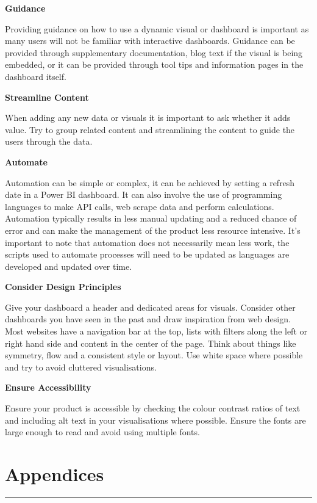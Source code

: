 \documentclass[
]{book}
\begin{document}
\textbf{Guidance}

Providing guidance on how to use a dynamic visual or dashboard is important as many users will not be familiar with interactive dashboards. Guidance can be provided through supplementary documentation, blog text if the visual is being embedded, or it can be provided through tool tips and information pages in the dashboard itself.

\textbf{Streamline Content}

When adding any new data or visuals it is important to ask whether it adds value. Try to group related content and streamlining the content to guide the users through the data.

\textbf{Automate }

Automation can be simple or complex, it can be achieved by setting a refresh date in a Power BI dashboard. It can also involve the use of programming languages to make API calls, web scrape data and perform calculations. Automation typically results in less manual updating and a reduced chance of error and can make the management of the product less resource intensive. It's important to note that automation does not necessarily mean less work, the scripts used to automate processes will need to be updated as languages are developed and updated over time.

\textbf{Consider Design Principles}

Give your dashboard a header and dedicated areas for visuals. Consider other dashboards you have seen in the past and draw inspiration from web design. Most websites have a navigation bar at the top, lists with filters along the left or right hand side and content in the center of the page. Think about things like symmetry, flow and a consistent style or layout. Use white space where possible and try to avoid cluttered visualisations.

\textbf{Ensure Accessibility}

Ensure your product is accessible by checking the colour contrast ratios of text and including alt text in your visualisations where possible. Ensure the fonts are large enough to read and avoid using multiple fonts.

\hypertarget{appendices}{%
\chapter*{Appendices}\label{appendices}}

\begin{center}\rule{0.5\linewidth}{0.5pt}\end{center}
\end{document}
